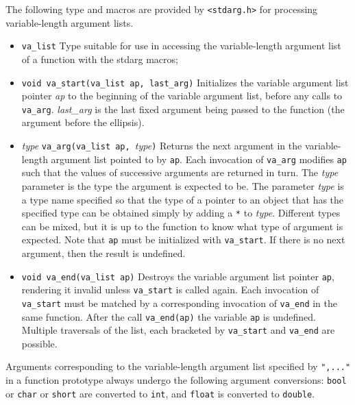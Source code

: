 \noindent
The following type and macros are provided by {\tt<stdarg.h>} for processing
variable-length argument lists.
\begin{itemize}
\item \texttt{va\_list}
\newline
Type suitable for use in accessing the variable-length argument list of a function
with the stdarg macros;
\item \texttt{void va\_start(va\_list ap, last\_arg)}
\newline
Initializes the variable argument list pointer \textit{ap} to the beginning of the
variable argument list, before any calls to \texttt{va\_arg}. \textit{last\_arg} is
the last fixed argument being passed to the function (the argument before the
ellipsis).
\item \textit{type} \texttt{va\_arg(va\_list ap, }\textit{type}\texttt{)}
\newline
Returns the next argument in the variable-length argument list pointed to by
\texttt{ap}. Each invocation of \texttt{va\_arg} modifies \texttt{ap} such that
the values of successive arguments are returned in turn. The \textit{type}
parameter is the type the argument is expected to be. The parameter \textit{type}
is a type name specified so that the type of a pointer to an object that has the
specified type can be obtained simply by adding a \texttt{*} to \textit{type}.
Different types can be mixed, but it is up to the function to know what type of
argument is expected. Note that \texttt{ap} must be initialized with
\texttt{va\_start}. If there is no next argument, then the result is undefined.
\item \texttt{void va\_end(va\_list ap)}
\newline
Destroys the variable argument list pointer \texttt{ap}, rendering it invalid
unless \texttt{va\_start} is called again. Each invocation of \texttt{va\_start}
must be matched by a corresponding invocation of \texttt{va\_end} in the same
function. After the call \texttt{va\_end(ap)} the variable \texttt{ap} is
undefined. Multiple traversals of the list, each bracketed by \texttt{va\_start}
and \texttt{va\_end} are possible.
\end{itemize}
\noindent
Arguments corresponding to the variable-length argument list specified by
\texttt{",..."} in a function prototype always undergo the following argument
conversions: \texttt{bool} or \texttt{char} or \texttt{short} are converted to
\texttt{int}, and \texttt{float} is converted to \texttt{double}.
\newline

